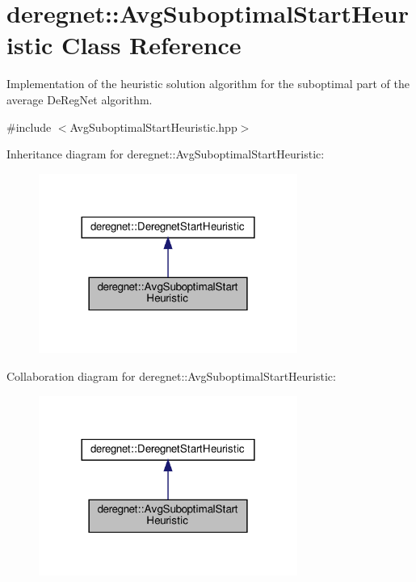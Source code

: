 \hypertarget{classderegnet_1_1AvgSuboptimalStartHeuristic}{}\section{deregnet\+:\+:Avg\+Suboptimal\+Start\+Heuristic Class Reference}
\label{classderegnet_1_1AvgSuboptimalStartHeuristic}


Implementation of the heuristic solution algorithm for the suboptimal part of the average De\+Reg\+Net algorithm.  




{\ttfamily \#include $<$Avg\+Suboptimal\+Start\+Heuristic.\+hpp$>$}



Inheritance diagram for deregnet\+:\+:Avg\+Suboptimal\+Start\+Heuristic\+:\nopagebreak
\begin{figure}[H]
\begin{center}
\leavevmode
\includegraphics[width=240pt]{classderegnet_1_1AvgSuboptimalStartHeuristic__inherit__graph}
\end{center}
\end{figure}


Collaboration diagram for deregnet\+:\+:Avg\+Suboptimal\+Start\+Heuristic\+:\nopagebreak
\begin{figure}[H]
\begin{center}
\leavevmode
\includegraphics[width=240pt]{classderegnet_1_1AvgSuboptimalStartHeuristic__coll__graph}
\end{center}
\end{figure}
